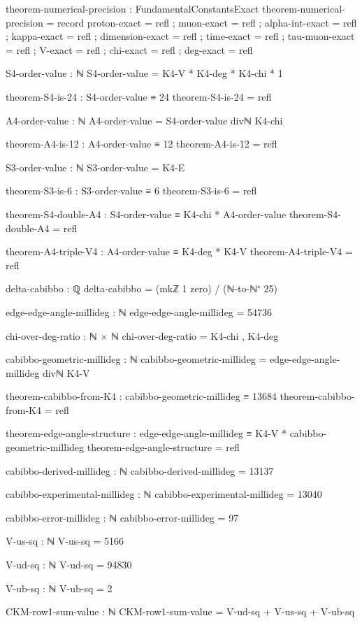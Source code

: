 \documentclass[11pt,a4paper]{book}
\begin{document}
\begin{code}
theorem-numerical-precision : FundamentalConstantsExact
theorem-numerical-precision = record
  { proton-exact     = refl
  ; muon-exact       = refl
  ; alpha-int-exact  = refl
  ; kappa-exact      = refl
  ; dimension-exact  = refl
  ; time-exact       = refl
  ; tau-muon-exact   = refl
  ; V-exact          = refl
  ; chi-exact        = refl
  ; deg-exact        = refl
  }

S4-order-value : ℕ
S4-order-value = K4-V * K4-deg * K4-chi * 1

theorem-S4-is-24 : S4-order-value ≡ 24
theorem-S4-is-24 = refl

A4-order-value : ℕ
A4-order-value = S4-order-value divℕ K4-chi

theorem-A4-is-12 : A4-order-value ≡ 12
theorem-A4-is-12 = refl

S3-order-value : ℕ
S3-order-value = K4-E

theorem-S3-is-6 : S3-order-value ≡ 6
theorem-S3-is-6 = refl

theorem-S4-double-A4 : S4-order-value ≡ K4-chi * A4-order-value
theorem-S4-double-A4 = refl

theorem-A4-triple-V4 : A4-order-value ≡ K4-deg * K4-V
theorem-A4-triple-V4 = refl

delta-cabibbo : ℚ
delta-cabibbo = (mkℤ 1 zero) / (ℕ-to-ℕ⁺ 25)

edge-edge-angle-millideg : ℕ
edge-edge-angle-millideg = 54736

chi-over-deg-ratio : ℕ × ℕ
chi-over-deg-ratio = K4-chi , K4-deg

cabibbo-geometric-millideg : ℕ
cabibbo-geometric-millideg = edge-edge-angle-millideg divℕ K4-V

theorem-cabibbo-from-K4 : cabibbo-geometric-millideg ≡ 13684
theorem-cabibbo-from-K4 = refl

theorem-edge-angle-structure : edge-edge-angle-millideg ≡ K4-V * cabibbo-geometric-millideg
theorem-edge-angle-structure = refl

cabibbo-derived-millideg : ℕ
cabibbo-derived-millideg = 13137

cabibbo-experimental-millideg : ℕ
cabibbo-experimental-millideg = 13040

cabibbo-error-millideg : ℕ
cabibbo-error-millideg = 97

V-us-sq : ℕ
V-us-sq = 5166

V-ud-sq : ℕ
V-ud-sq = 94830

V-ub-sq : ℕ
V-ub-sq = 2

CKM-row1-sum-value : ℕ
CKM-row1-sum-value = V-ud-sq + V-us-sq + V-ub-sq


\end{code}
\end{document}

